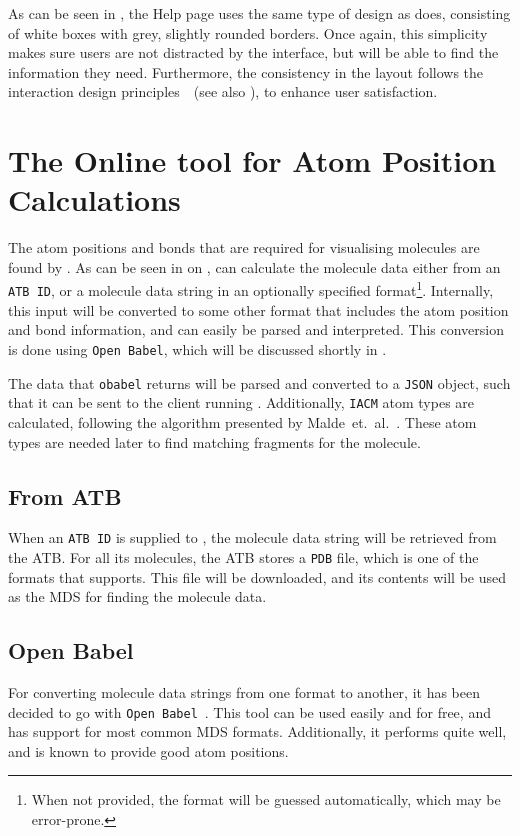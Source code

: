 As can be seen in , the Help page uses the same type of design as \oframp{} does, consisting of white boxes with grey, slightly rounded borders. Once again, this simplicity makes sure users are not distracted by the interface, but will be able to find the information they need. Furthermore, the consistency in the layout follows the interaction design principles~\cite{norman2010gestural,blair2008user}~(see also ), to enhance user satisfaction.


\section[\oapoc]{The Online tool for Atom Position Calculations}
The atom positions and bonds that are required for visualising molecules are found by \oapoc. As can be seen in  on , \oapoc{} can calculate the molecule data either from an \verb|ATB ID|, or a molecule data string in an optionally specified format\footnote{When not provided, the format will be guessed automatically, which may be error-prone.}. Internally, this input will be converted to some other format that includes the atom position and bond information, and can easily be parsed and interpreted. This conversion is done using \verb|Open Babel|, which will be discussed shortly in .

The data that \verb|obabel| returns will be parsed and converted to a \verb|JSON| object, such that it can be sent to the client running \oframp. Additionally, \verb|IACM| atom types are calculated, following the algorithm presented by Malde~et.~al.~\cite{malde2011automated}. These atom types are needed later to find matching fragments for the molecule.

\subsection{From ATB}
When an \verb|ATB ID| is supplied to \oapoc, the molecule data string will be retrieved from the ATB. For all its molecules, the ATB stores a \verb|PDB| file, which is one of the formats that \oapoc{} supports. This file will be downloaded, and its contents will be used as the MDS for finding the molecule data.

\subsection{Open Babel}
For converting molecule data strings from one format to another, it has been decided to go with \verb|Open Babel|~\cite{oboyle2011open}. This tool can be used easily and for free, and has support for most common MDS formats. Additionally, it performs quite well, and is known to provide good atom positions.

